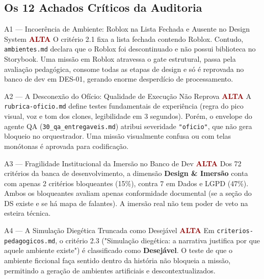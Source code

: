 \documentclass[11pt,a4paper]{article}
\newcommand{\sevalta}{\textcolor{DarkRed}{\textbf{ALTA}}}
\begin{document}
\subsection{Os 12 Achados Cr\'iticos da Auditoria}

\begin{achadobox}{A1 --- Incoer\^encia de Ambiente: Roblox na Lista Fechada e Ausente no Design System \hfill \sevalta}
O crit\'erio 2.1 fixa a lista fechada contendo Roblox. Contudo, \texttt{ambientes.md} declara que o Roblox foi descontinuado e n\~ao possui biblioteca no Storybook. Uma miss\~ao em Roblox atravessa o gate estrutural, passa pela avalia\c{c}\~ao pedag\'ogica, consome todas as etapas de design e s\'o \'e reprovada no banco de dev em DES-01, gerando enorme desperd\'icio de processamento.
\end{achadobox}

\begin{achadobox}{A2 --- A Desconex\~ao do Of\'icio: Qualidade de Execu\c{c}\~ao N\~ao Reprova \hfill \sevalta}
A \texttt{rubrica-oficio.md} define testes fundamentais de experi\^encia (regra do pico visual, voz e tom dos clones, legibilidade em 3 segundos). Por\'em, o envelope do agente QA (\texttt{30\_qa\_entregaveis.md}) atribui severidade \texttt{"oficio"}, que n\~ao gera bloqueio no orquestrador. Uma miss\~ao visualmente confusa ou com telas mon\'otonas \'e aprovada para codifica\c{c}\~ao.
\end{achadobox}

\begin{achadobox}{A3 --- Fragilidade Institucional da Imers\~ao no Banco de Dev \hfill \sevalta}
Dos 72 crit\'erios da banca de desenvolvimento, a dimens\~ao \textbf{Design \& Imers\~ao} conta com apenas 2 crit\'erios bloqueantes (15\%), contra 7 em Dados e LGPD (47\%). Ambos os bloqueantes avaliam apenas conformidade documental (se a se\c{c}\~ao do DS existe e se h\'a mapa de falantes). A imers\~ao real n\~ao tem poder de veto na esteira t\'ecnica.
\end{achadobox}

\begin{achadobox}{A4 --- A Simula\c{c}\~ao Dieg\'etica Truncada como Desej\'avel \hfill \sevalta}
Em \texttt{criterios-pedagogicos.md}, o crit\'erio 2.3 ("Simula\c{c}\~ao dieg\'etica: a narrativa justifica por que aquele ambiente existe") \'e classificado como \textbf{Desej\'avel}. O teste de que o ambiente ficcional faça sentido dentro da hist\'oria n\~ao bloqueia a miss\~ao, permitindo a gera\c{c}\~ao de ambientes artificiais e descontextualizados.
\end{achadobox}
\end{document}
